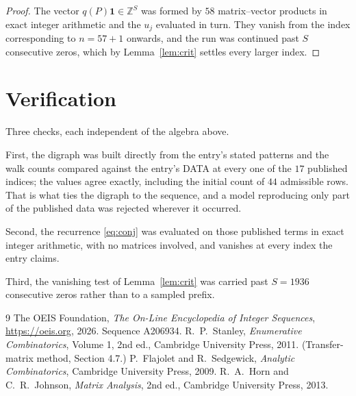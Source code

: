 \documentclass[11pt,a4paper]{article}
\theoremstyle{plain}
\theoremstyle{definition}
\begin{document}
\begin{proof}
The vector $q(P)\mathbf{1}\in\mathbb{Z}^{S}$ was formed by $58$ matrix--vector
products in exact integer arithmetic and the $u_j$ evaluated in turn. They vanish from the
index corresponding to $n=57+1$ onwards, and the run was continued past $S$ consecutive
zeros, which by Lemma~\ref{lem:crit} settles every larger index.
\end{proof}

\section{Verification}

Three checks, each independent of the algebra above.

First, the digraph was built directly from the entry's stated patterns and the walk counts
compared against the entry's DATA at every one of the $17$ published indices; the
values agree exactly, including the initial count of $44$ admissible rows. That is
what ties the digraph to the sequence, and a model reproducing only part of the published
data was rejected wherever it occurred.

Second, the recurrence \eqref{eq:conj} was evaluated on those published terms in exact
integer arithmetic, with no matrices involved, and vanishes at every index the entry claims.

Third, the vanishing test of Lemma~\ref{lem:crit} was carried past $S=1936$ consecutive
zeros rather than to a sampled prefix.

\begin{thebibliography}{9}
 The OEIS Foundation, \emph{The On-Line Encyclopedia of Integer
Sequences}, \url{https://oeis.org}, 2026. Sequence A206934.
 R.~P.~Stanley, \emph{Enumerative Combinatorics}, Volume 1, 2nd ed.,
Cambridge University Press, 2011. (Transfer-matrix method, Section 4.7.)
 P.~Flajolet and R.~Sedgewick, \emph{Analytic Combinatorics}, Cambridge
University Press, 2009.
 R.~A.~Horn and C.~R.~Johnson, \emph{Matrix Analysis}, 2nd ed., Cambridge
University Press, 2013.
\end{thebibliography}
\end{document}
